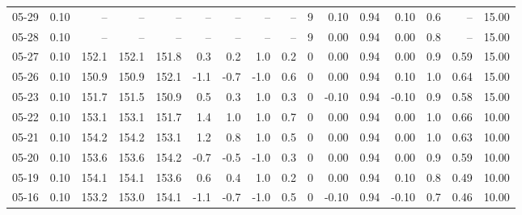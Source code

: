 \begin{threeparttable}
{\begin{tabular}{lrrrrrrrrrrrrrrr}
  05-29 &     0.10 &    -- &    -- &    -- &         -- &             -- &                       -- &                  -- &              9 &       0.10 &      0.94 &           0.10 &              0.6 &              -- &                  15.00 \\
  05-28 &     0.10 &    -- &    -- &    -- &         -- &             -- &                       -- &                  -- &              9 &       0.00 &      0.94 &           0.00 &              0.8 &              -- &                  15.00 \\
  05-27 &     0.10 & 152.1 & 152.1 & 151.8 &        0.3 &            0.2 &                      1.0 &                 0.2 &              0 &       0.00 &      0.94 &           0.00 &              0.9 &            0.59 &                  15.00 \\
  05-26 &     0.10 & 150.9 & 150.9 & 152.1 &       -1.1 &           -0.7 &                     -1.0 &                 0.6 &              0 &       0.00 &      0.94 &           0.10 &              1.0 &            0.64 &                  15.00 \\
  05-23 &     0.10 & 151.7 & 151.5 & 150.9 &        0.5 &            0.3 &                      1.0 &                 0.3 &              0 &      -0.10 &      0.94 &          -0.10 &              0.9 &            0.58 &                  15.00 \\
  05-22 &     0.10 & 153.1 & 153.1 & 151.7 &        1.4 &            1.0 &                      1.0 &                 0.7 &              0 &       0.00 &      0.94 &           0.00 &              1.0 &            0.66 &                  10.00 \\
  05-21 &     0.10 & 154.2 & 154.2 & 153.1 &        1.2 &            0.8 &                      1.0 &                 0.5 &              0 &       0.00 &      0.94 &           0.00 &              1.0 &            0.63 &                  10.00 \\
  05-20 &     0.10 & 153.6 & 153.6 & 154.2 &       -0.7 &           -0.5 &                     -1.0 &                 0.3 &              0 &       0.00 &      0.94 &           0.00 &              0.9 &            0.59 &                  10.00 \\
  05-19 &     0.10 & 154.1 & 154.1 & 153.6 &        0.6 &            0.4 &                      1.0 &                 0.2 &              0 &       0.00 &      0.94 &           0.10 &              0.8 &            0.49 &                  10.00 \\
  05-16 &     0.10 & 153.2 & 153.0 & 154.1 &       -1.1 &           -0.7 &                     -1.0 &                 0.5 &              0 &      -0.10 &      0.94 &          -0.10 &              0.7 &            0.46 &                  10.00 \\

\end{tabular}}
\end{threeparttable}
